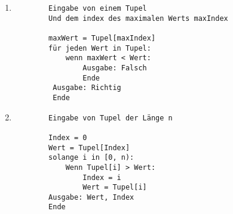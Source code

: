 \begin{enumerate}
	\item
	\begin{verbatim}
		Eingabe von einem Tupel
		Und dem index des maximalen Werts maxIndex
	
		maxWert = Tupel[maxIndex]
		für jeden Wert in Tupel:
		    wenn maxWert < Wert:
		        Ausgabe: Falsch
		        Ende
		 Ausgabe: Richtig
		 Ende
	\end{verbatim}
		
	\item 
	\begin{verbatim}
		Eingabe von Tupel der Länge n
		
		Index = 0
		Wert = Tupel[Index]
		solange i in [0, n):
		    Wenn Tupel[i] > Wert:
		        Index = i
		        Wert = Tupel[i] 
		Ausgabe: Wert, Index
		Ende
	\end{verbatim}
	
\end{enumerate}

